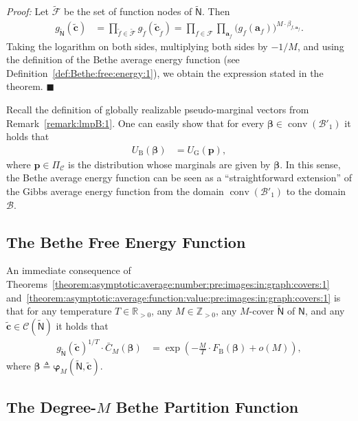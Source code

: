 \documentclass[journal, twocolumn]{IEEEtran}
\renewcommand{\mathbf}[1]{{\bm{#1}}}
\newcommand{\Rpp}{\mathbb{R}_{>0}}
\newcommand{\Z}{\mathbb{Z}}
\newcommand{\Zpp}{\Z_{>0}}
\newcommand{\vect}[1]{\mathbf{#1}}
\newcommand{\code}[1]{\mathcal{#1}}
\newcommand{\set}[1]{\mathcal{#1}}
\newcommand{\graph}[1]{\mathsf{#1}}
\newcommand{\defeq}{\triangleq}
\newcommand{\codeC}{\code{C}}
\newcommand{\codeCedge}{\code{C}}
\newcommand{\bel}{\beta}
\newcommand{\vbel}{\boldsymbol{\bel}}
\newcommand{\setF}{\set{F}}
\newcommand{\csetF}{\set{\tilde F}}
\newcommand{\va}{\vect{a}}
\newcommand{\cf}{\tilde f}
\newcommand{\cvc}{\vect{\cover{c}}}
\newcommand{\vp}{\vect{p}}
\newcommand{\lmpB}{\mathcal{B}}
\newcommand{\lmpBdown}[1]{\mathcal{B}'_{#1}}
\newcommand{\graphN}{\graph{N}}
\newcommand{\convhull}{\operatorname{conv}}
\newcommand{\FBethe}{F_{\mathrm{B}}}
\newcommand{\UBethe}{U_{\mathrm{B}}}
\newcommand{\cover}[1]{\tilde{#1}}
\newcommand{\cgraph}[1]{\cover{\graph{#1}}}
\newcommand{\?}{\mathrm{?}}
\newcommand{\varphiM}{\boldsymbol{\varphi}_{M}}
\newcommand{\qedblack}{\hspace*{\fill}%
  $\blacksquare$\smallskip}
\newcommand{\UGibbs}{U_{\mathrm{G}}}
\newcommand{\setPi}{\Pi}
\newenvironment{Proof}%
  {\noindent \emph{Proof:}}{\qedblack}
\begin{document}
\begin{Proof}
  Let $\csetF$ be the set of function nodes of $\cgraph{N}$. Then
  \begin{align*}
    g_{\cgraph{N}}(\cvc)
      &= \prod_{\cf \in \csetF}
           g_{\cf}(\cvc_{\cf})
       = \prod_{f \in \setF}
           \prod_{\va_f}
             \big(
               g_{f}(\va_f)
             \big)^{M \cdot \bel_{f,\va_f}}.
  \end{align*}
  Taking the logarithm on both sides, multiplying both sides by $-1/M$, and
  using the definition of the Bethe average energy function (see
  Definition~\ref{def:Bethe:free:energy:1}), we obtain the expression stated
  in the theorem.
\end{Proof}


Recall the definition of globally realizable pseudo-marginal vectors from
Remark~\ref{remark:lmpB:1}. One can easily show that for every $\vbel \in
\convhull(\lmpBdown{1})$ it holds that
\begin{align*}
  \UBethe(\vbel)
    &= \UGibbs(\vp),
\end{align*}
where $\vp \in \setPi_{\codeC}$ is the distribution whose marginals are given
by $\vbel$. In this sense, the Bethe average energy function can be seen as a
``straightforward extension'' of the Gibbs average energy function from the
domain $\convhull(\lmpBdown{1})$ to the domain $\lmpB$.



\subsection{The Bethe Free Energy Function}


An immediate consequence of
Theorems~\ref{theorem:asymptotic:average:number:pre:images:in:graph:covers:1}
and~\ref{theorem:asymptotic:average:function:value:pre:images:in:graph:covers:1}
is that for any temperature $T \in \Rpp$, any $M \in \Zpp$, any $M$-cover
$\cgraph{N}$ of $\graphN$, and any $\cvc \in \codeCedge(\cgraph{N})$ it holds
that
\begin{align}
  g_{\cgraph{N}}(\cvc)^{1/T}
  \cdot
  \bar C_M(\vbel)
    &= \exp
         \left(
           -
           \frac{M}{T} \cdot \FBethe(\vbel)
           +
           o(M)
         \right),
         \label{eq:combinatorial:characterization:Bethe:free:energy:1}
\end{align}
where $\vbel \defeq \varphiM(\cgraph{N}, \cvc)$.


\subsection{The Degree-$M$ Bethe Partition Function}
\label{sec:degree:M:Bethe:partition:function:1}
\end{document}

